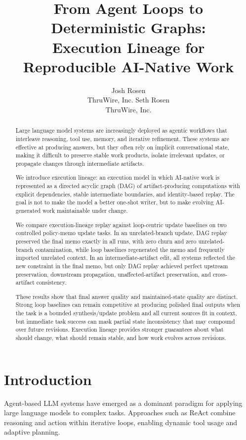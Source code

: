 \documentclass{article}
\title{From Agent Loops to Deterministic Graphs:\\
Execution Lineage for Reproducible AI-Native Work}
\author{
  Josh Rosen \\
  ThruWire, Inc.
  \And
  Seth Rosen \\
  ThruWire, Inc.
}
\begin{document}
\maketitle

\begin{abstract}
Large language model systems are increasingly deployed as agentic workflows that interleave reasoning, tool use, memory, and iterative refinement. These systems are effective at producing answers, but they often rely on implicit conversational state, making it difficult to preserve stable work products, isolate irrelevant updates, or propagate changes through intermediate artifacts.

We introduce execution lineage: an execution model in which AI-native work is represented as a directed acyclic graph (DAG) of artifact-producing computations with explicit dependencies, stable intermediate boundaries, and identity-based replay. The goal is not to make the model a better one-shot writer, but to make evolving AI-generated work maintainable under change.

We compare execution-lineage replay against loop-centric update baselines on two controlled policy-memo update tasks. In an unrelated-branch update, DAG replay preserved the final memo exactly in all runs, with zero churn and zero unrelated-branch contamination, while loop baselines regenerated the memo and frequently imported unrelated context. In an intermediate-artifact edit, all systems reflected the new constraint in the final memo, but only DAG replay achieved perfect upstream preservation, downstream propagation, unaffected-artifact preservation, and cross-artifact consistency.

These results show that final answer quality and maintained-state quality are distinct. Strong loop baselines can remain competitive at producing polished final outputs when the task is a bounded synthesis/update problem and all current sources fit in context, but immediate task success can mask partial state inconsistency that may compound over future revisions. Execution lineage provides stronger guarantees about what should change, what should remain stable, and how work evolves across revisions.
\end{abstract}

\section{Introduction}

Agent-based LLM systems have emerged as a dominant paradigm for applying large language models to complex tasks. Approaches such as ReAct \cite{yao2023react} combine reasoning and action within iterative loops, enabling dynamic tool usage and adaptive planning.
\end{document}
